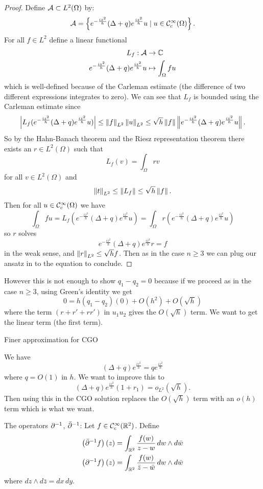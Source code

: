 \begin{proof}
  Define $\mathcal{A} \subset L^2(\Omega)$ by:
  \[ \mathcal{A} = \left\{ e^{-\frac{iz^2}h}(\Delta+q)e^\frac{iz^2}h u \mid u \in \mathcal{C}_c^\infty(\Omega) \right\}. \]
  For all $f \in L^2$ define a linear functional
  \begin{align*}
    L_f: \mathcal{A} &\to \mathbb{C} \\
    e^{-\frac{iz^2}h}(\Delta+q)e^\frac{iz^2}h u &\mapsto \int_\Omega fu
  \end{align*}
  which is well-defined because of the Carleman estimate (the difference of two different expressions integrates to zero).
  We can see that $L_f$ is bounded using the Carleman estimate since
  \[ \left\lvert L_f(e^{-\frac{iz^2}h}(\Delta+q)e^\frac{iz^2}h u) \right\rvert \leq \left\lVert f \right\rVert_{L^2}\left\lVert u \right\rVert_{L^2} \leq \sqrt{h}\left\lVert f \right\rVert\left\lVert e^{-\frac{iz^2}h}(\Delta+q)e^\frac{iz^2}h u \right\rVert. \]
  So by the Hahn-Banach theorem and the Riesz representation theorem there exists an $r \in L^2(\Omega)$ such that
  \[ L_f(v) = \int_\Omega rv \]
  for all $v \in L^2(\Omega)$ and
  \[ \left\lVert t \right\rVert_{L^2} \leq \left\lVert L_f \right\rVert \leq \sqrt{h}\left\lVert f \right\rVert. \]
  Then for all $u \in \mathcal{C}_c^\infty(\Omega)$ we have
  \[ \int_\Omega fu = L_f(e^{-\frac{iz^2}h}(\Delta+q)e^\frac{iz^2}h u) = \int_\Omega r(e^{-\frac{iz^2}h}(\Delta+q)e^\frac{iz^2}h u) \]
  so $r$ solves
  \[ e^{-\frac{iz^2}h}(\Delta+q)e^\frac{iz^2}h r = f \]
  in the weak sense, and $\left\lVert r \right\rVert_{L^2} \leq \sqrt{h}f$.
  Then as in the case $n \geq 3$ we can plug our ansatz in to the equation to conclude.
\end{proof}

However this is not enough to show $q_1-q_2=0$ because if we proceed as in the case $n \geq 3$, using Green's identity we get
\[ 0 = h(q_1-q_2)(0) + O(h^2) + O(\sqrt{h}) \]
where the term $(r+r'+rr')$ in $u_1u_2$ gives the $O(\sqrt{h})$ term.
We want to get the linear term (the first term).

Finer approximation for CGO

We have
\[ (\Delta+q)e^\frac{iz^2}h=qe^\frac{iz^2}h \]
where $q = O(1)$ in $h$.
We want to improve this to
\[ (\Delta+q)e^\frac{iz^2}h(1+r_1)=o_{L^2}(\sqrt{h}). \]
Then using this in the CGO solution replaces the $O(\sqrt{h})$ term with an $o(h)$ term which is what we want.

The operators $\partial^{-1}$, $\bar{\partial}^{-1}$:
Let $f \in \mathcal{C}_c^\infty(\mathbb{R}^2)$.
Define
\begin{align*}
  \left(\bar{\partial}^{-1} f\right)(z) &= \int_{\mathbb{R}^2} \frac{f(w)}{z-w} \, dw \wedge d\bar w \\
  \left(\partial^{-1} f\right)(z) &= \int_{\mathbb{R}^2} \frac{f(w)}{\bar z-\bar w} \, dw \wedge d\bar w
\end{align*}
where $dz \wedge d\bar z = dx \, dy$.

